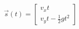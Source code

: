 \documentclass[preview]{standalone}
\begin{document}
\begin{align*}
\vec{s}(t) = \begin{bmatrix} v_x t \\ v_y t - \frac{1}{2}gt^2 \end{bmatrix}
\end{align*}
\end{document}

